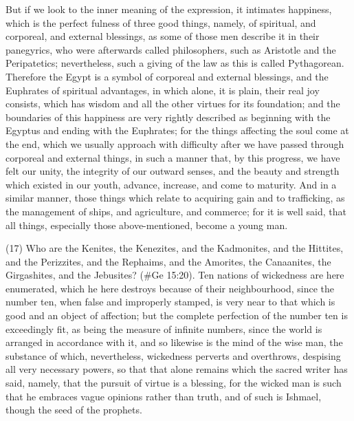 But if we look to the inner meaning of the expression, it intimates happiness, which is the perfect
fulness of three good things, namely, of spiritual, and corporeal, and external blessings, as some
of those men describe it in their panegyrics, who were afterwards called philosophers, such as
Aristotle and the Peripatetics; nevertheless, such a giving of the law as this is called Pythagorean.
Therefore the Egypt is a symbol of corporeal and external blessings, and the Euphrates of spiritual
advantages, in which alone, it is plain, their real joy consists, which has wisdom and all the other
virtues for its foundation; and the boundaries of this happiness are very rightly described as
beginning with the Egyptus and ending with the Euphrates; for the things affecting the soul come at
the end, which we usually approach with difficulty after we have passed through corporeal and
external things, in such a manner that, by this progress, we have felt our unity, the integrity of our
outward senses, and the beauty and strength which existed in our youth, advance, increase, and
come to maturity. And in a similar manner, those things which relate to acquiring gain and to
trafficking, as the management of ships, and agriculture, and commerce; for it is well said, that all
things, especially those above-mentioned, become a young man.

(17) Who are the Kenites, the Kenezites, and the Kadmonites, and the Hittites, and the Perizzites,
and the Rephaims, and the Amorites, the Canaanites, the Girgashites, and the Jebusites?
(\#Ge 15:20). Ten nations of wickedness are here enumerated, which he here destroys
because of their neighbourhood, since the number ten, when false and improperly stamped, is very
near to that which is good and an object of affection; but the complete perfection of the number ten
is exceedingly fit, as being the measure of infinite numbers, since the world is arranged in
accordance with it, and so likewise is the mind of the wise man, the substance of which,
nevertheless, wickedness perverts and overthrows, despising all very necessary powers, so that
that alone remains which the sacred writer has said, namely, that the pursuit of virtue is a blessing,
for the wicked man is such that he embraces vague opinions rather than truth, and of such is
Ishmael, though the seed of the prophets.

